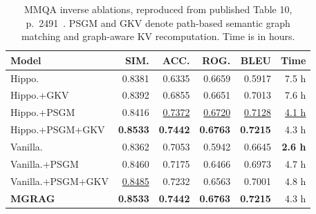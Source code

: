 \begin{table}[!htbp]
\centering
\small
\setlength{\tabcolsep}{3pt}
\caption{MMQA inverse ablations, reproduced from published Table 10, p.~2491~\cite{mgrag-paper}. PSGM and GKV denote path-based semantic graph matching and graph-aware KV recomputation. Time is in hours.}\label{tab:mgrag:inverse}
\begin{tabular}{lrrrrr}
\toprule
Model & SIM. & ACC. & ROG. & BLEU & Time\\
\midrule
Hippo.            & 0.8381          & 0.6335          & 0.6659          & 0.5917          & 7.5 h           \\
Hippo.+GKV        & 0.8392          & 0.6855          & 0.6651          & 0.7013          & 7.6 h           \\
Hippo.+PSGM       & 0.8416          & \underline{0.7372}  & \underline{0.6720}  & \underline{0.7128}  & \underline{4.1 h}   \\
Hippo.+PSGM+GKV   & \textbf{0.8533} & \textbf{0.7442} & \textbf{0.6763} & \textbf{0.7215} & 4.3 h           \\
\midrule
Vanilla.          & 0.8362          & 0.7053          & 0.5942          & 0.6645          & \textbf{2.6 h}  \\
Vanilla.+PSGM     & 0.8460          & 0.7175          & 0.6466          & 0.6973          & 4.7 h           \\
Vanilla.+PSGM+GKV & \underline{0.8485}  & 0.7232          & 0.6563          & 0.7001          & 4.8 h           \\
\midrule
\textbf{MGRAG}    & \textbf{0.8533} & \textbf{0.7442} & \textbf{0.6763} & \textbf{0.7215} & 4.3 h           \\
\bottomrule
\end{tabular}
\end{table}
